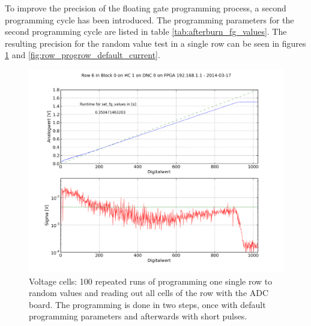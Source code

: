 \documentclass[a4paper,twocolumn,draft=true]{scrartcl}
\begin{document}
To improve the precision of the floating gate programming process, a second programming cycle has been introduced.
The programming parameters for the second programming cycle are listed in table \ref{tab:afterburn_fg_values}.
The resulting precision for the random value test in a single row can be seen in figures \ref{fig:row_progrow_default_voltage} and \ref{fig:row_progrow_default_current}.

\begin{figure}
\includegraphics[scale=.28]{figures/single_row_random_progonerow_afterburn_voltage.png}
\caption{Voltage cells: 100 repeated runs of programming one single row to random values and reading out all cells of the row with the ADC board. The programming is done in two steps, once with default programming parameters and afterwards with short pulses.}
\label{fig:row_progrow_default_voltage}
\end{figure}
\end{document}
